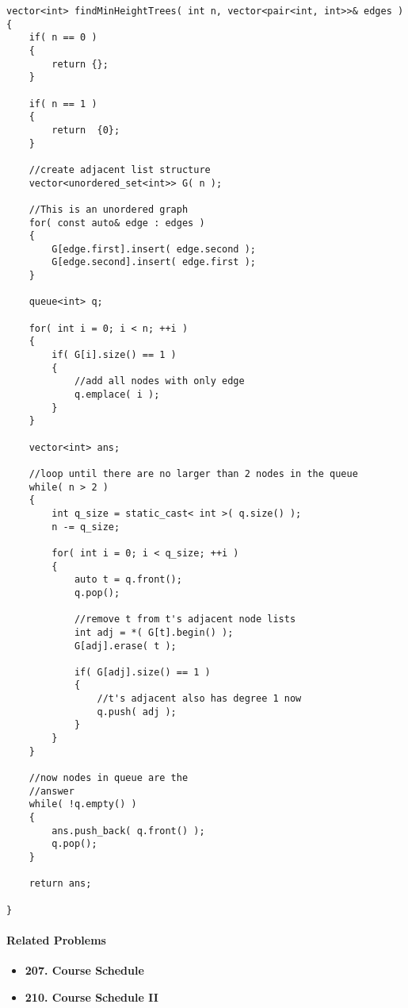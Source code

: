 \begin{lstlisting}[style=customc, caption={Breadth First Search}]
vector<int> findMinHeightTrees( int n, vector<pair<int, int>>& edges )
{
    if( n == 0 )
    {
        return {};
    }

    if( n == 1 )
    {
        return  {0};
    }

    //create adjacent list structure
    vector<unordered_set<int>> G( n );

    //This is an unordered graph
    for( const auto& edge : edges )
    {
        G[edge.first].insert( edge.second );
        G[edge.second].insert( edge.first );
    }

    queue<int> q;

    for( int i = 0; i < n; ++i )
    {
        if( G[i].size() == 1 )
        {
            //add all nodes with only edge
            q.emplace( i );
        }
    }

    vector<int> ans;

    //loop until there are no larger than 2 nodes in the queue
    while( n > 2 )
    {
        int q_size = static_cast< int >( q.size() );
        n -= q_size;

        for( int i = 0; i < q_size; ++i )
        {
            auto t = q.front();
            q.pop();

            //remove t from t's adjacent node lists
            int adj = *( G[t].begin() );
            G[adj].erase( t );

            if( G[adj].size() == 1 )
            {
                //t's adjacent also has degree 1 now
                q.push( adj );
            }
        }
    }

    //now nodes in queue are the
    //answer
    while( !q.empty() )
    {
        ans.push_back( q.front() );
        q.pop();
    }

    return ans;

}

\end{lstlisting}

\paragraph{Related Problems}
\begin{itemize}
\item \textbf{207. Course Schedule}
\item \textbf{210. Course Schedule II}
\end{itemize}